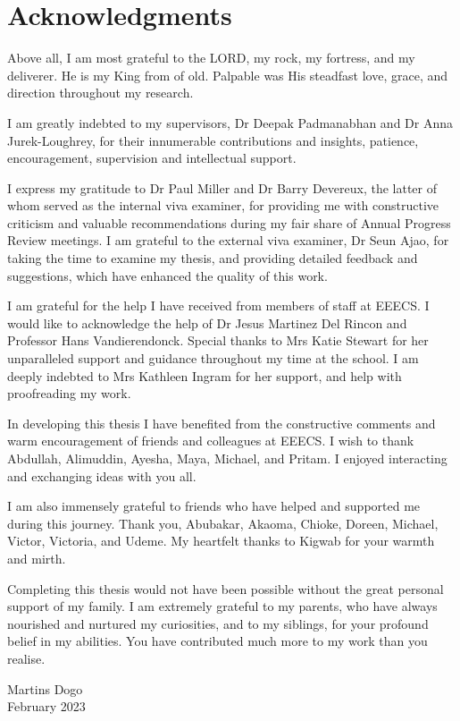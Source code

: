 
\bigskip

\begingroup
\let\clearpage\relax
\let\cleardoublepage\relax
\let\cleardoublepage\relax
\chapter*{Acknowledgments}

Above all, I am most grateful to the LORD, my rock, my fortress, and my deliverer. He is my King from of old. Palpable was His steadfast love, grace, and direction throughout my research.

I am greatly indebted to my supervisors, Dr Deepak Padmanabhan and Dr Anna Jurek-Loughrey, for their innumerable contributions and insights, patience, encouragement, supervision and intellectual support.

I express my gratitude to Dr Paul Miller and Dr Barry Devereux, the latter of whom served as the internal viva examiner, for providing me with constructive criticism and valuable recommendations during my fair share of Annual Progress Review meetings. I am grateful to the external viva examiner, Dr Seun Ajao, for taking the time to examine my thesis, and providing detailed feedback and suggestions, which have enhanced the quality of this work.

I am grateful for the help I have received from members of staff at EEECS. I would like to acknowledge the help of Dr Jesus Martinez Del Rincon and Professor Hans Vandierendonck. Special thanks to Mrs Katie Stewart for her unparalleled support and guidance throughout my time at the school. I am deeply indebted to Mrs Kathleen Ingram for her support, and help with proofreading my work.

In developing this thesis I have benefited from the constructive comments and warm encouragement of friends and colleagues at EEECS. I wish to thank Abdullah, Alimuddin, Ayesha, Maya, Michael, and Pritam. I enjoyed interacting and exchanging ideas with you all.

I am also immensely grateful to friends who have helped and supported me during this journey. Thank you, Abubakar, Akaoma, Chioke, Doreen, Michael, Victor, Victoria, and Udeme. My heartfelt thanks to Kigwab for your warmth and mirth.

Completing this thesis would not have been possible without the great personal support of my family. I am extremely grateful to my parents, who have always nourished and nurtured my curiosities, and to my siblings, for your profound belief in my abilities. You have contributed much more to my work than you realise.

\begin{flushright}
  Martins Dogo \\
  February 2023
\end{flushright}

\endgroup
